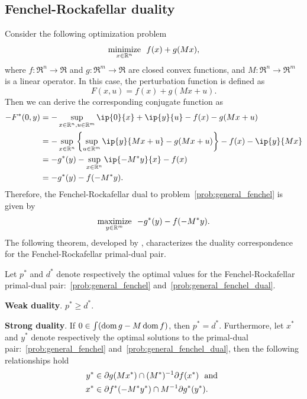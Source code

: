 \subsection{Fenchel-Rockafellar duality}
Consider the following optimization problem 
\begin{equation} \label{prob:general_fenchel} 
    \displaystyle\mathop{\hbox{\rm minimize}}_{x \in \mathbb{R}^n}\enspace f(x) + g(Mx),
\end{equation}
where $f:\Re^n\to\Re$ and $g:\Re^m\to\Re$ are closed convex functions, and $M:\Re^n\to\Re^m$ is a linear operator. In this case, the perturbation function is defined as 
\begin{equation}
    F(x, u) = f(x) + g(Mx + u).
\end{equation}
Then we can derive the corresponding conjugate function as
\begin{align*}
    -F^*(0, y) &= -\sup_{x\in\Re^n, u\in\Re^m} \ip{0}{x} + \ip{y}{u} - f(x) - g(Mx + u)
             \\&= -\sup_{x\in\Re^n} \left\{\sup_{u\in\Re^m} \ip{y}{Mx + u} - g(Mx + u)\right\} - f(x) - \ip{y}{Mx}
             \\&= - g^*(y) - \sup_{x\in\Re^n}\ip{-M^*y}{x} - f(x) 
             \\&= - g^*(y) - f(-M^*y).
\end{align*}
Therefore, the Fenchel-Rockafellar dual to problem~\eqref{prob:general_fenchel} is given by
\begin{equation} \label{prob:general_fenchel_dual}
    \displaystyle\mathop{\hbox{\rm maximize}}_{y\in\mathbb{R}^m}\enspace - g^*(y) - f(-M^*y).
\end{equation}
The following theorem, developed by \citet{rockafellar1970convex}, characterizes the duality correspondence for the Fenchel-Rockafellar primal-dual pair. 

\begin{theorem} 
    Let $p^*$ and $d^*$ denote respectively the optimal values for the Fenchel-Rockafellar primal-dual pair:~\eqref{prob:general_fenchel} and~\eqref{prob:general_fenchel_dual}. 
    \item \textbf{Weak duality}. $p^* \geq d^*$. 
    \item \textbf{Strong duality}. 
    If $0\in\int(\operatorname{dom} g - M\operatorname{dom} f)$, then $p^* = d^*$. Furthermore, let $x^*$ and $y^*$ denote respectively the optimal solutions to the primal-dual pair:~\eqref{prob:general_fenchel} and~\eqref{prob:general_fenchel_dual}, then the following relationships hold
    \begin{align*}
          y^* &\in \partial g(Mx^*) \cap (M^*)^{-1}\partial f(x^*) \enspace\mathop{\hbox{\rm and}}\enspace
        \\x^* &\in \partial f^*(-M^*y^*)\cap M^{-1}\partial g^*(y^*).
    \end{align*}
\end{theorem}




